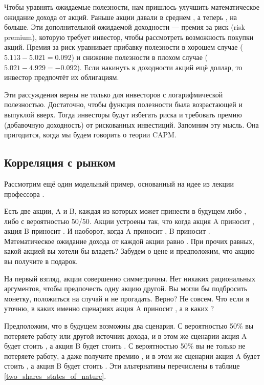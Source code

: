 Чтобы уравнять ожидаемые полезности, нам пришлось улучшить математическое 
ожидание дохода от акций. Раньше акции давали в среднем , а 
теперь , на  больше. Эти  
дополнительной ожидаемой доходности --- премия за риск (risk premium), которую 
требует инвестор, чтобы рассмотреть возможность покупки акций. Премия за риск 
уравнивает прибавку полезности в хорошем случае ($5.113 - 5.021 = 0.092$) и 
снижение полезности в плохом случае ($5.021 - 4.929 = -0.092$). Если накинуть к 
доходности акций ещё доллар, то инвестор предпочтёт их облигациям.
 
Эти рассуждения верны не только для инвесторов с логарифмической полезностью. 
Достаточно, чтобы функция полезности была возрастающей и выпуклой вверх. Тогда 
инвесторы будут избегать риска и требовать премию (добавочную доходность) от 
рискованных инвестиций. Запомним эту мысль. Она пригодится, когда мы будем 
говорить о теории CAPM.

\subsection{Корреляция с рынком}

Рассмотрим ещё один модельный пример, основанный на идее из лекции профессора
 \cite{cochrane2013consumption}.

Есть две акции, A и B, каждая из которых может принести в будущем либо 
, либо  с вероятностью 50/50. Акции устроены так, что 
когда акция A приносит , акция B приносит . И 
наоборот, когда A приносит , B приносит . 
Математическое ожидание дохода от каждой акции равно . При прочих 
равных, какой акцией вы хотели бы владеть? Забудем о цене и предположим, что 
акцию вы получите в подарок.

На первый взгляд, акции совершенно симметричны. Нет никаких рациональных 
аргументов, чтобы предпочесть одну акцию другой. Вы могли бы подбросить монетку, 
положиться на случай и не прогадать. Верно? Не совсем. Что если я уточню, в 
каких именно сценариях акция A приносит , а в каких ?

Предположим, что в будущем возможны два сценария. С вероятностью 50\% вы 
потеряете работу или другой источник дохода, и в этом же сценарии акция A будет 
стоить , а акция B будет стоить . С вероятностью 50\% 
вы не только не потеряете работу, а даже получите премию , и в 
этом же сценарии акция A будет стоить , а акция B будет стоить 
. Эти альтернативы перечислены в таблице  
\ref{two_shares_states_of_nature}.


